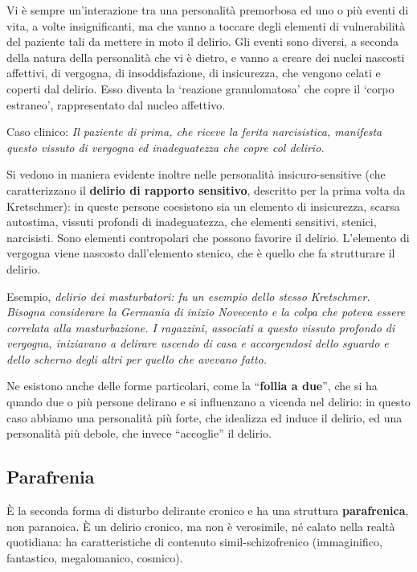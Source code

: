 Vi è sempre un'interazione tra una personalità premorbosa ed uno o più
eventi di vita, a volte insignificanti, ma che vanno a toccare degli
elementi di vulnerabilità del paziente tali da mettere in moto il
delirio. Gli eventi sono diversi, a seconda della natura della
personalità che vi è dietro, e vanno a creare dei nuclei nascosti
affettivi, di vergogna, di insoddisfazione, di insicurezza, che vengono
celati e coperti dal delirio. Esso diventa la `reazione granulomatosa'
che copre il `corpo estraneo', rappresentato dal nucleo affettivo.

Caso clinico: \emph{Il paziente di prima, che riceve la ferita
narcisistica, manifesta questo vissuto di vergogna ed inadeguatezza che
copre col delirio.}

Si vedono in maniera evidente inoltre nelle personalità
insicuro-sensitive (che caratterizzano il \textbf{delirio di rapporto
sensitivo}, descritto per la prima volta da Kretschmer): in queste
persone coesistono sia un elemento di insicurezza, scarsa autostima,
vissuti profondi di inadeguatezza, che elementi sensitivi, stenici,
narcisisti. Sono elementi contropolari che possono favorire il delirio.
L'elemento di vergogna viene nascosto dall'elemento stenico, che è
quello che fa strutturare il delirio.

Esempio, \emph{delirio dei masturbatori: fu un esempio dello stesso
Kretschmer. Bisogna considerare la Germania di inizio Novecento e la
colpa che poteva essere correlata alla masturbazione. I ragazzini,
associati a questo vissuto profondo di vergogna, iniziavano a delirare
uscendo di casa e accorgendosi dello sguardo e dello scherno degli altri
per quello che avevano fatto.}

Ne esistono anche delle forme particolari, come la ``\textbf{follia a
due}'', che si ha quando due o più persone delirano e si influenzano a
vicenda nel delirio: in questo caso abbiamo una personalità più forte,
che idealizza ed induce il delirio, ed una personalità più debole, che
invece ``accoglie'' il delirio.


\subsection{Parafrenia}

È la seconda forma di disturbo delirante cronico e ha una struttura
\textbf{parafrenica}, non paranoica. È un delirio cronico, ma non è
verosimile, né calato nella realtà quotidiana: ha caratteristiche di
contenuto simil-schizofrenico (immaginifico, fantastico, megalomanico,
cosmico).

